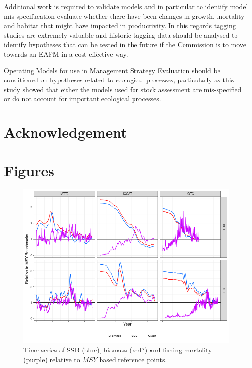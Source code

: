 \documentclass[12pt,doublespacing,a4paper]{ouparticle}
\begin{document}
Additional work is required to validate models and in particular to identify model mis-specifucation evaluate whether there have been changes in growth, mortality and  habitat that might have impacted in productivity. In this regards tagging studies are extremely valuable and historic tagging data should be analysed to identify hypotheses that can be tested in the future if the Commission is to move towards an EAFM in a cost effective way. 



Operating Models for use in Management Strategy Evaluation should be conditioned on hypotheses related to ecological processes, particularly as this study showed that either the models used for stock assessment are mis-specified or do not account for important ecological processes.


\section{Acknowledgement}


\clearpage


%

\clearpage
\section{Figures}


\newpage
\begin{figure}[h]
\centering
\includegraphics[width=\textwidth]{pe-tsmsy-1.png}
\caption{Time series of SSB (blue), biomass (red?) and fishing mortality (purple) relative to $MSY$ based reference points.}
\label{fig:ts}
\end{figure}
\end{document}
